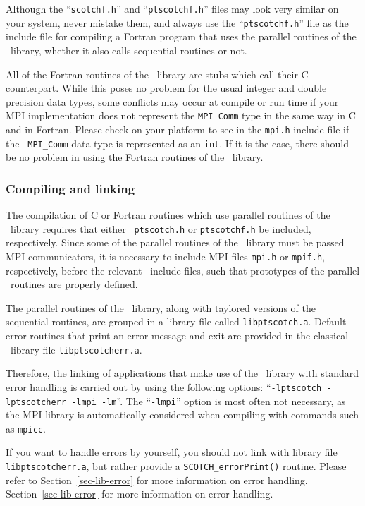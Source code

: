 Although the ``{\tt scotchf.h}'' and ``{\tt ptscotchf.h}'' files may
look very similar on your system, never mistake them, and always use
the ``{\tt ptscotchf.h}'' file as the include file for compiling a
Fortran program that uses the parallel routines of the
\libscotch\ library, whether it also calls sequential routines or not.

All of the Fortran routines of the \libscotch\ library are stubs which
call their C counterpart. While this poses no problem for the usual
integer and double precision data types, some conflicts may occur at
compile or run time if your MPI implementation does not represent the
{\tt MPI\_Comm} type in the same way in C and in Fortran. Please check
on your platform to see in the {\tt mpi.h} include file if the {\tt
MPI\_Comm} data type is represented as an {\tt int}. If it is the
case, there should be no problem in using the Fortran routines of
the \ptscotch\ library.

\subsubsection{Compiling and linking}

The compilation of C or Fortran routines which use parallel
routines of the \libscotch\ library requires that either {\tt
ptscotch.h} or {\tt ptscotchf.h} be included, respectively. Since some
of the parallel routines of the \libscotch\ library must be passed MPI
communicators, it is necessary to include MPI files {\tt mpi.h} or
{\tt mpif.h}, respectively, before the relevant \ptscotch\ include
files, such that prototypes of the parallel \libscotch\ routines are
properly defined.

The parallel routines of the \libscotch\ library, along with
taylored versions of the sequential routines, are grouped in a
library file called {\tt libptscotch.a}. Default error routines that
print an error message and exit are provided in the classical
\scotch\ library file {\tt libptscotcherr.a}.

Therefore, the linking of applications that make use of the
\libscotch\ library with standard error handling is carried out by
using the following options: ``{\tt -lptscotch -lptscotcherr -lmpi -lm}''.
The ``{\tt -lmpi}'' option is most often not necessary, as the MPI
library is automatically considered when compiling with commands such
as {\tt mpicc}.

If you want to handle errors by yourself, you should not link with
library file {\tt libptscotcherr.a}, but rather provide a
{\tt SCOTCH\_\lbt error\lbt Print()} routine. Please refer to
Section~\ref{sec-lib-error} for more information on error handling.
Section~\ref{sec-lib-error} for more information on error handling.

